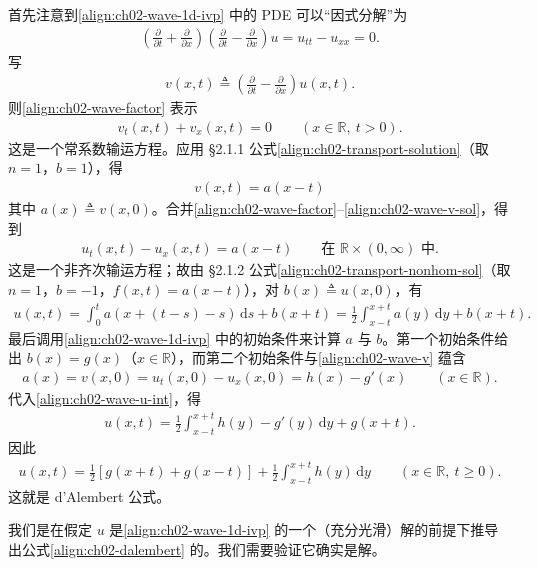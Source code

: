 \documentclass[../../main.tex]{subfiles}
\begin{document}
首先注意到\eqref{align:ch02-wave-1d-ivp} 中的 PDE 可以``因式分解''为
\begin{align}\label{align:ch02-wave-factor}
\left(\frac{\partial}{\partial t}+\frac{\partial}{\partial x}\right)\left(\frac{\partial}{\partial t}-\frac{\partial}{\partial x}\right)u=u_{tt}-u_{xx}=0.
\end{align}
写
\begin{align}\label{align:ch02-wave-v}
v(x,t)\triangleq\left(\frac{\partial}{\partial t}-\frac{\partial}{\partial x}\right)u(x,t).
\end{align}
则\eqref{align:ch02-wave-factor} 表示
\begin{align*}
v_t(x,t)+v_x(x,t)=0 \qquad (x\in\mathbb{R},\ t>0).
\end{align*}
这是一个常系数输运方程。应用 \S2.1.1 公式\eqref{align:ch02-transport-solution}（取 $n=1$，$b=1$），得
\begin{align}\label{align:ch02-wave-v-sol}
v(x,t)=a(x-t)
\end{align}
其中 $a(x)\triangleq v(x,0)$。合并\eqref{align:ch02-wave-factor}--\eqref{align:ch02-wave-v-sol}，得到
\begin{align*}
u_t(x,t)-u_x(x,t)=a(x-t) \qquad \text{在 }\mathbb{R}\times(0,\infty)\text{ 中}.
\end{align*}
这是一个非齐次输运方程；故由 \S2.1.2 公式\eqref{align:ch02-transport-nonhom-sol}（取 $n=1$，$b=-1$，$f(x,t)=a(x-t)$），对 $b(x)\triangleq u(x,0)$，有
\begin{align}\label{align:ch02-wave-u-int}
u(x,t)=\int_0^t a(x+(t-s)-s)\,\mathrm{d}s+b(x+t)
=\frac{1}{2}\int_{x-t}^{x+t}a(y)\,\mathrm{d}y+b(x+t).
\end{align}
最后调用\eqref{align:ch02-wave-1d-ivp} 中的初始条件来计算 $a$ 与 $b$。第一个初始条件给出 $b(x)=g(x)$（$x\in\mathbb{R}$），而第二个初始条件与\eqref{align:ch02-wave-v} 蕴含
\begin{align*}
a(x)=v(x,0)=u_t(x,0)-u_x(x,0)=h(x)-g'(x) \qquad (x\in\mathbb{R}).
\end{align*}
代入\eqref{align:ch02-wave-u-int}，得
\begin{align*}
u(x,t)=\frac{1}{2}\int_{x-t}^{x+t}h(y)-g'(y)\,\mathrm{d}y+g(x+t).
\end{align*}
因此
\begin{align}\label{align:ch02-dalembert}
u(x,t)=\frac{1}{2}[g(x+t)+g(x-t)]+\frac{1}{2}\int_{x-t}^{x+t}h(y)\,\mathrm{d}y \qquad (x\in\mathbb{R},\ t\geqslant 0).
\end{align}
这就是 d'Alembert 公式。

我们是在假定 $u$ 是\eqref{align:ch02-wave-1d-ivp} 的一个（充分光滑）解的前提下推导出公式\eqref{align:ch02-dalembert} 的。我们需要验证它确实是解。
\end{document}

